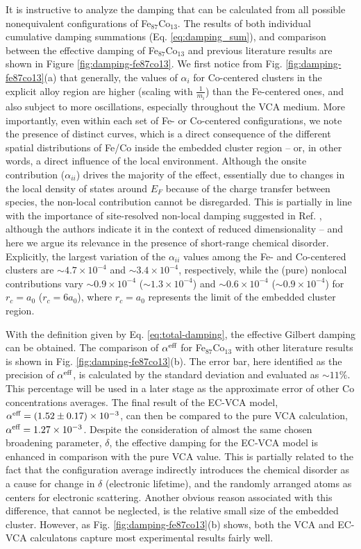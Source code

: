 It is instructive to analyze the damping that can be calculated from all possible nonequivalent configurations of Fe$_{87}$Co$_{13}$. The results of both individual cumulative damping summations (Eq. \ref{eq:damping_sum}), and comparison between the effective damping of Fe$_{87}$Co$_{13}$ and previous literature results are shown in Figure \ref{fig:damping-fe87co13}. We first notice from Fig. \ref{fig:damping-fe87co13}(a) that generally, the values of $\alpha_i$ for Co-centered clusters in the explicit alloy region are higher (scaling with $\frac{1}{m_i}$) than the Fe-centered ones, and also subject to more oscillations, especially throughout the VCA medium. More importantly, even within each set of Fe- or Co-centered configurations, we note the presence of distinct curves, which is a direct consequence of the different spatial distributions of Fe/Co inside the embedded cluster region -- or, in other words, a direct influence of the local environment. Although the onsite contribution ($\alpha_{ii}$) drives the majority of the effect, essentially due to changes in the local density of states around $E_F$ because of the charge transfer between species, the non-local contribution cannot be disregarded. This is partially in line with the importance of site-resolved non-local damping suggested in Ref. \cite{PhysRevB.109.094417}, although the authors indicate it in the context of reduced dimensionality -- and here we argue its relevance in the presence of short-range chemical disorder. Explicitly, the largest variation of the $\alpha_{ii}$ values among the Fe- and Co-centered clusters are $\sim4.7\times10^{-4}$ and $\sim3.4\times10^{-4}$, respectively, while the (pure) nonlocal contributions vary $\sim0.9\times10^{-4}$ ($\sim1.3\times10^{-4}$) and $\sim0.6\times10^{-4}$ ($\sim0.9\times10^{-4}$) for $r_c=a_0$ ($r_c=6a_0$), where $r_c=a_0$ represents the limit of the embedded cluster region.


With the definition given by Eq. \ref{eq:total-damping}, the effective Gilbert damping can be obtained. The comparison of $\alpha^{\textnormal{eff}}$ for Fe$_{87}$Co$_{13}$ with other literature results is shown in Fig. \ref{fig:damping-fe87co13}(b). The error bar, here identified as the precision of $\alpha^{\textnormal{eff}}$, is calculated by the standard deviation and evaluated as $\sim11\%$. This percentage will be used in a later stage as the approximate error of other Co concentrations averages. The final result of the EC-VCA model, $\alpha^{\textnormal{eff}}=(1.52\pm0.17)\times10^{-3}$, can then be compared to the pure VCA calculation, $\alpha^{\textnormal{eff}}=1.27\times10^{-3}$. Despite the consideration of almost the same chosen broadening parameter, $\delta$, the effective damping for the EC-VCA model is enhanced in comparison with the pure VCA value. This is partially related to the fact that the configuration average indirectly introduces the chemical disorder as a cause for change in $\delta$ (electronic lifetime), and the randomly arranged atoms as centers for electronic scattering. Another obvious reason associated with this difference, that cannot be neglected, is the relative small size of the embedded cluster. However, as Fig. \ref{fig:damping-fe87co13}(b) shows, both the VCA and EC-VCA calculatons capture most experimental results fairly well. 


